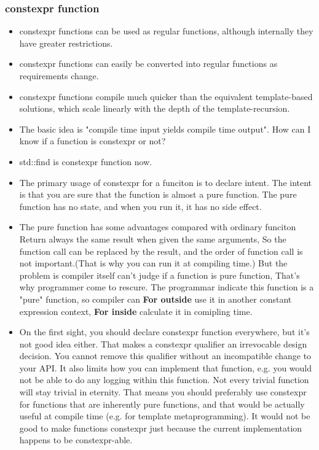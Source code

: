 \documentclass[a4paper,11pt,twoside]{book}
\begin{document}
\subsubsection{constexpr function}
\begin{itemize}
	
	\item constexpr functions can be used as regular functions, although internally they have greater restrictions.
	
	\item constexpr functions can easily be converted into regular functions as requirements change.
	
	\item constexpr functions compile much quicker than the equivalent template-based solutions, which scale linearly with the depth of the template-recursion.
	
	\item The basic idea is "compile time input yields compile time output". How can I know if a function is constexpr or not? 
	
	\item std::find is constexpr function now. 
	
	\item The primary usage of constexpr for a funciton is to declare intent. The intent is that you are sure that the function is almost a pure function. The pure function has no state, and when you run it, it has no side effect.
	\item The pure function has some advantages compared with ordinary funciton Return always the same result when given the same arguments, So the function call can be replaced by the result, and the order of function call is not important.(That is why you can run it at compiling time.) But the problem is compiler itself can't judge if a function is pure function, That's why programmer come to rescure. The programmar indicate this function is a "pure" function, so compiler can \textbf{For outside} use it in another constant expression context, \textbf{For inside} calculate it in comipling time. 
	
	\item On the first sight, you should declare constexpr function everywhere, but it's not good idea either. That makes a constexpr qualifier an irrevocable design decision. You cannot remove this qualifier without an incompatible change to your API. It also limits how you can implement that function, e.g. you would not be able to do any logging within this function. Not every trivial function will stay trivial in eternity. That means you should preferably use constexpr for functions that are inherently pure functions, and that would be actually useful at compile time (e.g. for template metaprogramming). It would not be good to make functions constexpr just because the current implementation happens to be constexpr-able.
	

\end{itemize}
\end{document}
